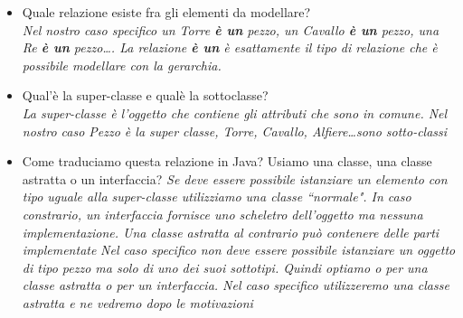 \documentclass{article}
\begin{document}
\begin{itemize}
\item Quale relazione esiste fra gli elementi da modellare?\\
\textit{Nel nostro caso specifico un Torre \textbf{\`e un} pezzo, un Cavallo \textbf{\`e un} pezzo,  una Re  \textbf{\`e un} pezzo\ldots. La relazione \textbf{\`e un} \`e esattamente il tipo di relazione che \`e possibile modellare con la gerarchia.}
\item Qual'\`e la super-classe e qual\`e la sottoclasse?\\
\textit{La super-classe \`e l'oggetto che contiene gli attributi che sono in comune. Nel nostro caso Pezzo \`e la super classe, Torre, Cavallo, Alfiere\ldots sono sotto-classi}
\item Come traduciamo questa relazione in Java? Usiamo una classe, una classe astratta o un interfaccia?
\textit{Se deve essere possibile istanziare un elemento con tipo uguale alla super-classe utilizziamo una classe ``normale". In caso constrario, un interfaccia fornisce uno scheletro dell'oggetto ma nessuna implementazione. Una classe astratta al contrario pu\`o contenere delle parti implementate}
\textit{Nel caso specifico non deve essere possibile istanziare un oggetto di tipo pezzo ma solo di uno dei suoi sottotipi. Quindi optiamo o per una classe astratta o per un interfaccia. Nel caso specifico utilizzeremo una classe astratta e ne vedremo dopo le motivazioni}
\end{itemize}
\end{document}

